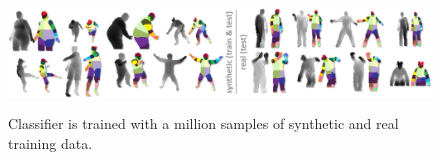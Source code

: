 \begin{figure}
	[h] \centering 
	\includegraphics[height=3cm]{figures/content/ni-train.jpg} \caption{Classifier is trained with a million samples of  synthetic and real training data. \cite{2} } \label{fg:ni:train} 
\end{figure}
